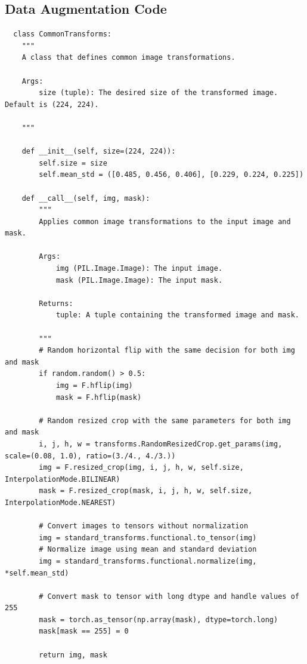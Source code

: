 \documentclass{article}
\begin{document}
\subsection{Data Augmentation Code}
\label{sec:data_augmentation_code}
\begin{verbatim}
  class CommonTransforms:
    """
    A class that defines common image transformations.

    Args:
        size (tuple): The desired size of the transformed image. Default is (224, 224).

    """

    def __init__(self, size=(224, 224)):
        self.size = size
        self.mean_std = ([0.485, 0.456, 0.406], [0.229, 0.224, 0.225])

    def __call__(self, img, mask):
        """
        Applies common image transformations to the input image and mask.

        Args:
            img (PIL.Image.Image): The input image.
            mask (PIL.Image.Image): The input mask.

        Returns:
            tuple: A tuple containing the transformed image and mask.

        """
        # Random horizontal flip with the same decision for both img and mask
        if random.random() > 0.5:
            img = F.hflip(img)
            mask = F.hflip(mask)

        # Random resized crop with the same parameters for both img and mask
        i, j, h, w = transforms.RandomResizedCrop.get_params(img, scale=(0.08, 1.0), ratio=(3./4., 4./3.))
        img = F.resized_crop(img, i, j, h, w, self.size, InterpolationMode.BILINEAR)
        mask = F.resized_crop(mask, i, j, h, w, self.size, InterpolationMode.NEAREST)

        # Convert images to tensors without normalization
        img = standard_transforms.functional.to_tensor(img)
        # Normalize image using mean and standard deviation
        img = standard_transforms.functional.normalize(img, *self.mean_std)

        # Convert mask to tensor with long dtype and handle values of 255
        mask = torch.as_tensor(np.array(mask), dtype=torch.long)
        mask[mask == 255] = 0

        return img, mask
\end{verbatim}
\end{document}
